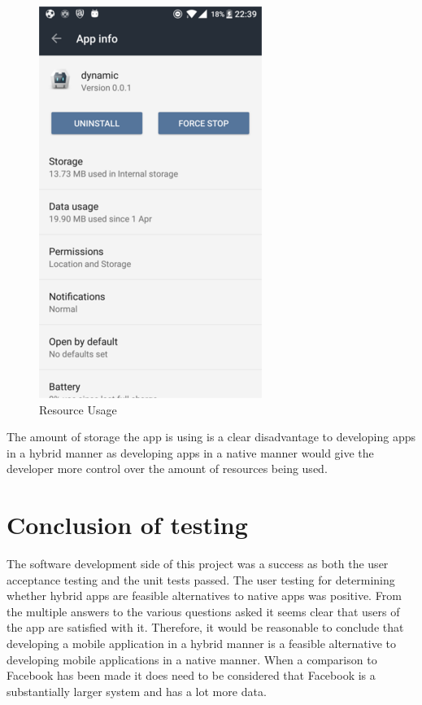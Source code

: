 \begin{center}
\begin{figure}[H]
\begin{center}
\includegraphics[scale=0.5]{images/usage}
\caption{Resource Usage}
\end{center}
\end{figure}
\end{center}

The amount of storage the app is using is a clear disadvantage to developing apps in a hybrid manner as developing apps in a native manner would give the developer more control over the amount of resources being used.

\section{Conclusion of testing}
The software development side of this project was a success as both the user acceptance testing and the unit tests passed. The user testing for determining whether hybrid apps are feasible alternatives to native apps was positive. From the multiple answers to the various questions asked it seems clear that users of the app are satisfied with it. Therefore, it would be reasonable to conclude that developing a mobile application in a hybrid manner is a feasible alternative to developing mobile applications in a native manner. When a comparison to Facebook has been made it does need to be considered that Facebook is a substantially larger system and has a lot more data. 

